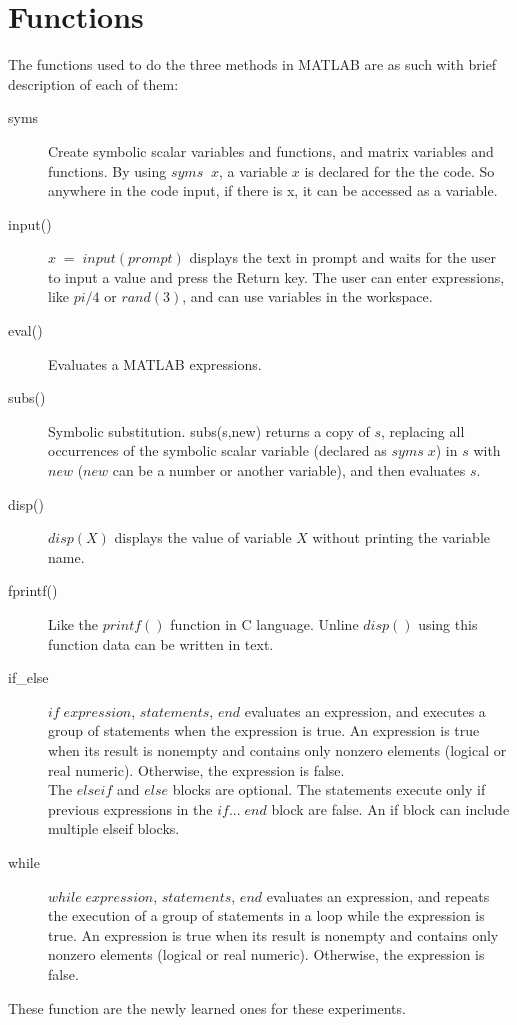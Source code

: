 \documentclass[12pt]{article}
\begin{document}




\pagebreak
\section*{Functions}
The functions used to do the three methods in MATLAB are as such with brief description of each of them:
\begin{description}
    \item[syms] Create symbolic scalar variables and functions, and matrix variables and functions. By using $syms\;\;x$, a variable $x$ is declared for the the code. So anywhere in the code input, if there is x, it can be accessed as a variable.
    \item[input()] $x\;=\;input(prompt)$ displays the text in prompt and waits for the user to input a value and press the Return key. The user can enter expressions, like $pi/4$ or $rand(3)$, and can use variables in the workspace.
    \item[eval()] Evaluates a MATLAB expressions.
    \item[subs()] Symbolic substitution. subs(s,new) returns a copy of $s$, replacing all occurrences of the symbolic scalar variable (declared as $syms\;x$) in $s$ with $new$ ($new$ can be a number or another variable), and then evaluates $s$.
    \item[disp()] $disp(X)$ displays the value of variable $X$ without printing the variable name.
    \item[fprintf()] Like the $printf()$ function in C language. Unline $disp()$ using this function data can be written in text.
    \item[if\_else] $if\;expression$, $statements$, $end$ evaluates an expression, and executes a group of statements when the expression is true. An expression is true when its result is nonempty and contains only nonzero elements (logical or real numeric). Otherwise, the expression is false.\\
          The $elseif$ and $else$ blocks are optional. The statements execute only if previous expressions in the $if...\;end$ block are false. An if block can include multiple elseif blocks.
    \item[while] $while\;expression$, $statements$, $end$ evaluates an expression, and repeats the execution of a group of statements in a loop while the expression is true. An expression is true when its result is nonempty and contains only nonzero elements (logical or real numeric). Otherwise, the expression is false.
\end{description}
These function are the newly learned ones for these experiments.\cite{matlab}
\pagebreak


\end{document}
